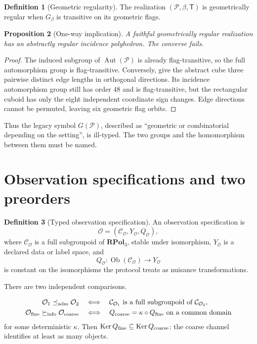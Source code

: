 \documentclass[11pt,a4paper]{article}
\theoremstyle{definition}
\newtheorem{definition}{Definition}[section]
\theoremstyle{plain}
\newtheorem{proposition}[definition]{Proposition}
\theoremstyle{remark}
\newcommand{\Aut}{\operatorname{Aut}}
\newcommand{\Ob}{\operatorname{Ob}}
\newcommand{\Ker}{\operatorname{Ker}}
\newcommand{\Ccal}{\mathcal C}
\newcommand{\Pcal}{\mathcal P}
\newcommand{\Ocal}{\mathcal O}
\begin{document}
\begin{definition}[Geometric regularity]
The realization \((\Pcal,\beta,\mathsf T)\) is geometrically regular
when \(G_\beta\) is transitive on its geometric flags.
\end{definition}

\begin{proposition}[One-way implication]
\label{prop:geometric-abstract}
A faithful geometrically regular realization has an abstractly
regular incidence polyhedron.  The converse fails.
\end{proposition}

\begin{proof}
The induced subgroup of \(\Aut(\Pcal)\) is already flag-transitive,
so the full automorphism group is flag-transitive.  Conversely, give
the abstract cube three pairwise distinct edge lengths in orthogonal
directions.  Its incidence automorphism group still has order \(48\)
and is flag-transitive, but the rectangular cuboid has only the eight
independent coordinate sign changes.  Edge directions cannot be
permuted, leaving six geometric flag orbits.
\end{proof}

Thus the legacy symbol \(G(\Pcal)\), described as ``geometric or
combinatorial depending on the setting'', is ill-typed.  The two
groups and the homomorphism between them must be named.

\section{Observation specifications and two preorders}

\begin{definition}[Typed observation specification]
An observation specification is
\[
\Ocal=(\Ccal_{\Ocal},Y_{\Ocal},Q_{\Ocal}),
\]
where \(\Ccal_{\Ocal}\) is a full subgroupoid of
\(\mathbf{RPol}_3\), stable under isomorphism, \(Y_{\Ocal}\) is a
declared data or label space, and
\[
Q_{\Ocal}:\Ob(\Ccal_{\Ocal})\longrightarrow Y_{\Ocal}
\]
is constant on the isomorphisms the protocol treats as nuisance
transformations.
\end{definition}

There are two independent comparisons.

\begin{align}
\Ocal_1\preceq_{\rm adm}\Ocal_2
&\quad\Longleftrightarrow\quad
\Ccal_{\Ocal_1}\text{ is a full subgroupoid of }\Ccal_{\Ocal_2},
\label{eq:admission}\\
\Ocal_{\rm fine}\succeq_{\rm info}\Ocal_{\rm coarse}
&\quad\Longleftrightarrow\quad
Q_{\rm coarse}=\kappa\circ Q_{\rm fine}
\text{ on a common domain}
\label{eq:information}
\end{align}
for some deterministic \(\kappa\).  Then
\(\Ker Q_{\rm fine}\subseteq\Ker Q_{\rm coarse}\): the coarse channel
identifies at least as many objects.
\end{document}
